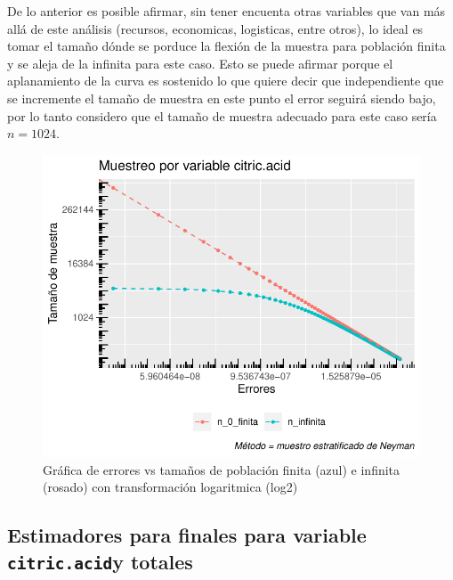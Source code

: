 \documentclass[
]{article}
\begin{document}
De lo anterior es posible afirmar, sin tener encuenta otras variables
que van más allá de este análisis (recursos, economicas, logisticas,
entre otros), lo ideal es tomar el tamaño dónde se porduce la flexión de
la muestra para población finita y se aleja de la infinita para este
caso. Esto se puede afirmar porque el aplanamiento de la curva es
sostenido lo que quiere decir que independiente que se incremente el
tamaño de muestra en este punto el error seguirá siendo bajo, por lo
tanto considero que el tamaño de muestra adecuado para este caso sería
\(n=1024\).

\begin{figure}
\centering
\includegraphics{muestreo_estratificado_final_files/figure-latex/grap uno de errores log2-1.pdf}
\caption{Gráfica de errores vs tamaños de población finita (azul) e
infinita (rosado) con transformación logaritmica (log2)}
\end{figure}

\hypertarget{estimadores-para-finales-para-variable-citric.acidy-totales}{%
\subsection{\texorpdfstring{Estimadores para finales para variable
\texttt{citric.acid}y
totales}{Estimadores para finales para variable citric.acidy totales}}\label{estimadores-para-finales-para-variable-citric.acidy-totales}}
\end{document}
